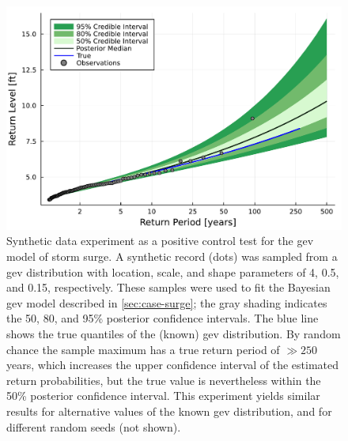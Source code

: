 \documentclass[ef,draft]{agutexSI2019}
\begin{document}
\begin{figure}
    \centering
    \includegraphics[width=\textwidth]{surge-synthetic-data-experiment}
    \caption{
        Synthetic data experiment as a positive control test for the \gls{gev} model of storm surge.
        A synthetic record (dots) was sampled from a \gls{gev} distribution with location, scale, and shape parameters of 4, 0.5, and 0.15, respectively.
        These samples were used to fit the Bayesian \gls{gev} model described in \cref{sec:case-surge}; the gray shading indicates the 50, 80, and 95\% posterior confidence intervals.
        The blue line shows the true quantiles of the (known) \gls{gev} distribution.
        By random chance the sample maximum has a true return period of $\gg 250$ years, which increases the upper confidence interval of the estimated return probabilities, but the true value is nevertheless within the 50\% posterior confidence interval.
        This experiment yields similar results for alternative values of the known \gls{gev} distribution, and for different random seeds (not shown).
    }\label{fig:surge-synthetic-data-experiment}
\end{figure}
\end{document}
